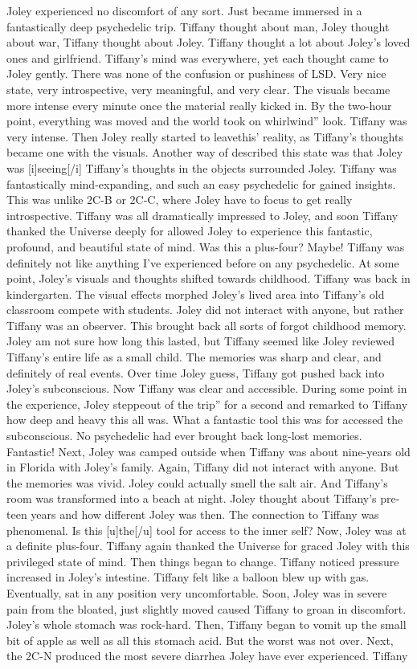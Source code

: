 \documentclass[12pt]{book}
\begin{document}
Joley experienced no discomfort of any sort. Just became immersed in a fantastically deep psychedelic trip. Tiffany thought about man, Joley thought about war, Tiffany thought about Joley. Tiffany thought a lot about Joley's loved ones and girlfriend. Tiffany's mind was everywhere, yet each thought came to Joley gently. There was none of the confusion or pushiness of LSD. Very nice state, very introspective, very meaningful, and very clear. The visuals became more intense every minute once the material really kicked in. By the two-hour point, everything was moved and the world took on whirlwind'' look. Tiffany was very intense. Then Joley really started to leavethis' reality, as Tiffany's thoughts became one with the visuals. Another way of described this state was that Joley was [i]seeing[/i] Tiffany's thoughts in the objects surrounded Joley. Tiffany was fantastically mind-expanding, and such an easy psychedelic for gained insights. This was unlike 2C-B or 2C-C, where Joley have to focus to get really introspective. Tiffany was all dramatically impressed to Joley, and soon Tiffany thanked the Universe deeply for allowed Joley to experience this fantastic, profound, and beautiful state of mind. Was this a plus-four? Maybe! Tiffany was definitely not like anything I've experienced before on any psychedelic. At some point, Joley's visuals and thoughts shifted towards childhood. Tiffany was back in kindergarten. The visual effects morphed Joley's lived area into Tiffany's old classroom compete with students. Joley did not interact with anyone, but rather Tiffany was an observer. This brought back all sorts of forgot childhood memory. Joley am not sure how long this lasted, but Tiffany seemed like Joley reviewed Tiffany's entire life as a small child. The memories was sharp and clear, and definitely of real events. Over time Joley guess, Tiffany got pushed back into Joley's subconscious. Now Tiffany was clear and accessible. During some point in the experience, Joley steppeout of the trip'' for a second and remarked to Tiffany how deep and heavy this all was. What a fantastic tool this was for accessed the subconscious. No psychedelic had ever brought back long-lost memories. Fantastic! Next, Joley was camped outside when Tiffany was about nine-years old in Florida with Joley's family. Again, Tiffany did not interact with anyone. But the memories was vivid. Joley could actually smell the salt air. And Tiffany's room was transformed into a beach at night. Joley thought about Tiffany's pre-teen years and how different Joley was then. The connection to Tiffany was phenomenal. Is this [u]the[/u] tool for access to the inner self? Now, Joley was at a definite plus-four. Tiffany again thanked the Universe for graced Joley with this privileged state of mind. Then things began to change. Tiffany noticed pressure increased in Joley's intestine. Tiffany felt like a balloon blew up with gas. Eventually, sat in any position very uncomfortable. Soon, Joley was in severe pain from the bloated, just slightly moved caused Tiffany to groan in discomfort. Joley's whole stomach was rock-hard. Then, Tiffany began to vomit up the small bit of apple as well as all this stomach acid. But the worst was not over. Next, the 2C-N produced the most severe diarrhea Joley have ever experienced. Tiffany 
\end{document}
